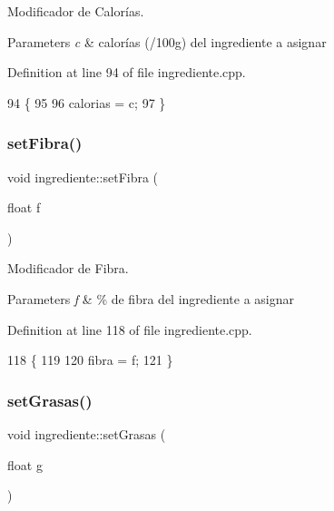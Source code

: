 Modificador de Calorías. 


\begin{DoxyParams}{Parameters}
{\em c} & calorías (/100g) del ingrediente a asignar \\
\hline
\end{DoxyParams}


Definition at line 94 of file ingrediente.\+cpp.


\begin{DoxyCode}
94                                   \{
95 
96     calorias = c;
97 \}
\end{DoxyCode}
\mbox{\label{classingrediente_a13928358db435d4a42b348f6ea1ee548}} 
\subsubsection{\texorpdfstring{set\+Fibra()}{setFibra()}}
{\footnotesize\ttfamily void ingrediente\+::set\+Fibra (\begin{DoxyParamCaption}\item[{float}]{f }\end{DoxyParamCaption})}



Modificador de Fibra. 


\begin{DoxyParams}{Parameters}
{\em f} & \% de fibra del ingrediente a asignar \\
\hline
\end{DoxyParams}


Definition at line 118 of file ingrediente.\+cpp.


\begin{DoxyCode}
118                                  \{
119 
120     fibra = f;
121 \}
\end{DoxyCode}
\mbox{\label{classingrediente_a5b20e7a788dcdb5685c66c7362d65533}} 
\subsubsection{\texorpdfstring{set\+Grasas()}{setGrasas()}}
{\footnotesize\ttfamily void ingrediente\+::set\+Grasas (\begin{DoxyParamCaption}\item[{float}]{g }\end{DoxyParamCaption})}



